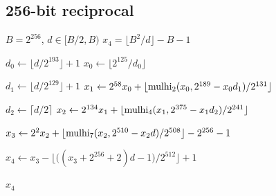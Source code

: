 \documentclass[12pt,oneside,draft]{scrartcl}
\begin{document}
\subsection{256-bit reciprocal}

\begin{algorithm}
\caption{Precomputed reciprocal~$v$ for~$B = 2^{256}$ with 64-bit word size and 63-bit initial estimate.}
\label{alg:reciprocal256}
\begin{algorithmic}[1]
\Require $B = 2^{256}$, $d \in [B / 2, B)$
\Ensure $x_{4} = \lfloor B^{2} / d \rfloor - B - 1$

\State $d_{0} \gets \lfloor d / 2^{193} \rfloor + 1$
\State $x_{0} \gets \lfloor 2^{125} / d_{0} \rfloor$

\State $d_{1} \gets \lfloor d / 2^{129} \rfloor + 1$
\State $x_{1} \gets 2^{58} x_{0} + \lfloor \operatorname{mulhi}_{2}(x_{0}, 2^{189} - x_{0} d_{1}) / 2^{131} \rfloor$

\State $d_{2} \gets \lceil d / 2 \rceil$
\State $x_{2} \gets 2^{134} x_{1} + \lfloor \operatorname{mulhi}_{4}(x_{1}, 2^{375} - x_{1} d_{2}) / 2^{241} \rfloor$

\State $x_{3} \gets 2^{2} x_{2} + \lfloor \operatorname{mulhi}_{7}(x_{2}, 2^{510} - x_{2} d) / 2^{508} \rfloor - 2^{256} - 1$

\State $x_{4} \gets x_{3} - \bigl\lfloor \bigl( (x_{3} + 2^{256} + 2) d - 1 \bigr) / 2^{512} \bigr\rfloor + 1$

\State \Return $x_{4}$
\end{algorithmic}
\end{algorithm}
\end{document}
